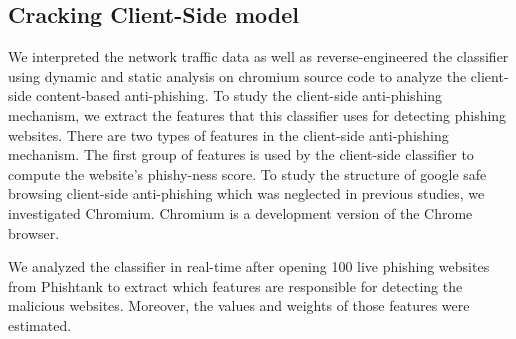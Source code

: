 \subsection{Cracking Client-Side model}


We interpreted the network traffic data as well as reverse-engineered the classifier using dynamic and static analysis on chromium source code to analyze the client-side content-based anti-phishing.
To study the client-side anti-phishing mechanism, we extract the features that this classifier uses for detecting phishing websites. There are two types of features in the client-side anti-phishing mechanism. The first group of features is used by the client-side classifier to compute the website's phishy-ness score. To study the structure of google safe browsing client-side anti-phishing which was neglected in previous studies, we investigated Chromium. Chromium is a development version of the Chrome browser. 

We analyzed the classifier in real-time after opening 100 live phishing websites from Phishtank to extract which features are responsible for detecting the malicious websites. Moreover, the values and weights of those features were estimated.

